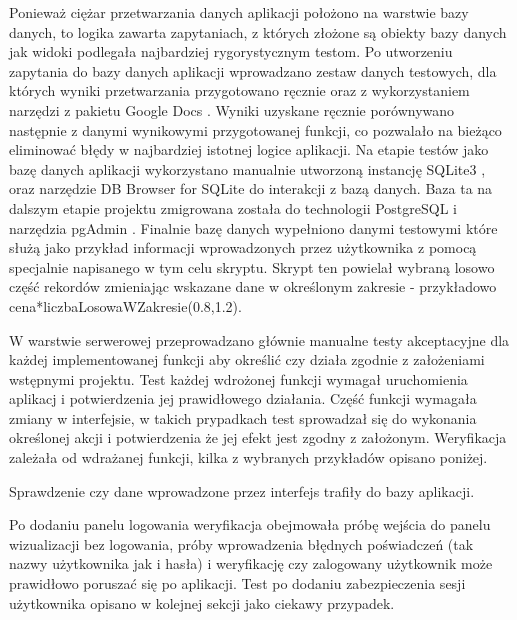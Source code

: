 \documentclass[a4paper,10pt, twoside]{report}
\begin{document}
\begin{large}
\medskip
{Ponieważ ciężar przetwarzania danych aplikacji położono na warstwie bazy 
danych, to logika zawarta zapytaniach, z których złożone są obiekty bazy danych 
jak widoki podlegała najbardziej rygorystycznym testom. Po utworzeniu zapytania 
do bazy danych aplikacji wprowadzano zestaw danych testowych, dla których wyniki
 przetwarzania przygotowano ręcznie oraz z wykorzystaniem narzędzi z pakietu 
Google Docs \cite{googledocs}. Wyniki uzyskane ręcznie porównywano następnie z 
danymi wynikowymi przygotowanej funkcji, co pozwalało na bieżąco eliminować 
błędy w najbardziej istotnej logice aplikacji. Na etapie testów jako bazę danych
 aplikacji wykorzystano manualnie utworzoną instancję SQLite3 \cite{SQLite}, 
oraz narzędzie DB Browser for SQLite \cite{DBBrowser} do interakcji z bazą 
danych. Baza ta na dalszym etapie projektu zmigrowana została do technologii 
PostgreSQL \cite{PostgreSQL} i narzędzia pgAdmin \cite{pgAdmin}. Finalnie bazę 
danych wypełniono danymi testowymi które służą jako przykład informacji 
wprowadzonych przez użytkownika z pomocą specjalnie napisanego w tym celu 
skryptu. Skrypt ten powielał wybraną losowo część rekordów zmieniając wskazane 
dane w określonym zakresie - przykładowo cena*liczbaLosowaWZakresie(0.8,1.2).}

\medskip
{W warstwie serwerowej przeprowadzano głównie manualne testy akceptacyjne dla 
każdej implementowanej funkcji aby określić czy działa zgodnie z założeniami 
wstępnymi projektu. Test każdej wdrożonej funkcji wymagał uruchomienia 
aplikacj i potwierdzenia jej prawidłowego działania. Część funkcji wymagała 
zmiany w interfejsie, w takich prypadkach test sprowadzał się do wykonania 
określonej akcji i potwierdzenia że jej efekt jest zgodny z założonym. 
Weryfikacja zależała od wdrażanej funkcji, kilka z wybranych przykładów opisano 
poniżej.}

{Sprawdzenie czy dane wprowadzone przez interfejs trafiły do bazy aplikacji.}

{Po dodaniu panelu logowania weryfikacja obejmowała próbę wejścia do panelu 
wizualizacji bez logowania, próby wprowadzenia błędnych poświadczeń (tak nazwy 
użytkownika jak i hasła) i weryfikację czy zalogowany użytkownik może prawidłowo
 poruszać się po aplikacji.}
{Test po dodaniu zabezpieczenia sesji użytkownika opisano w kolejnej sekcji jako
 ciekawy przypadek.}


\end{large}
\end{document}
